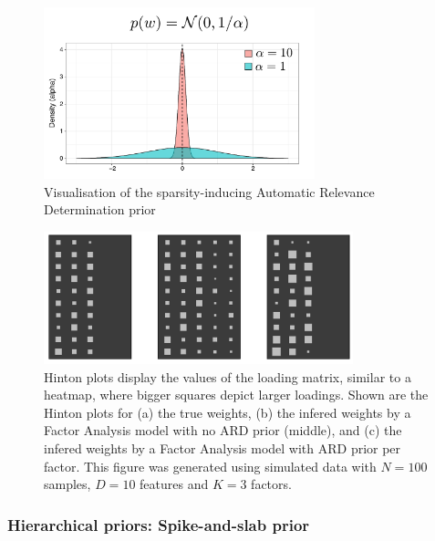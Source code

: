 \begin{figure}[H] \begin{center}
	\includegraphics[width=0.7\textwidth]{Chapter2/Figs/ard}
	\caption{Visualisation of the sparsity-inducing Automatic Relevance Determination prior}
	\label{fig:ard}
\end{center} \end{figure}

\begin{figure}[H] \begin{center}
	\includegraphics[width=0.8\textwidth]{Chapter2/Figs/hinton}
            \caption[(Copied from Damien's thesis) Hinton plot of the loading matrix for a Bayesian Factor Analysis model with an ARD prior]{Hinton plots display the values of the loading matrix, similar to a heatmap, where bigger squares depict larger loadings. Shown are the Hinton plots for (a) the true weights, (b) the infered weights by a Factor Analysis model with no ARD prior (middle), and (c) the infered weights by a Factor Analysis model with ARD prior per factor. This figure was generated using simulated data with $N=100$ samples, $D=10$ features and $K=3$ factors.}
	\label{fig:hinton}
\end{center} \end{figure}

\subsubsection{Hierarchical priors: Spike-and-slab prior} \label{section_spikeslab}


